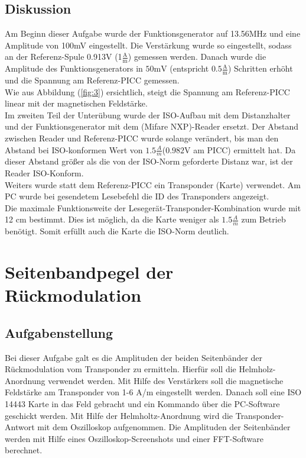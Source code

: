 \documentclass[12pt,a4paper,ngerman]{article}
\begin{document}
\subsection{Diskussion}
Am Beginn dieser Aufgabe wurde der Funktionsgenerator auf 13.56MHz und eine Amplitude von 100mV eingestellt. 
Die Verstärkung wurde so eingestellt, sodass an der Referenz-Spule 0.913V (1$\frac{\text{A}}{\text{m}}$) gemessen werden.
Danach wurde die Amplitude des Funktionsgenerators in $50 \text{mV}$ (entspricht $0.5 \frac{\text{A}}{\text{m}}$) Schritten erhöht und die Spannung am Referenz-PICC gemessen. \\
Wie aus Abbildung (\ref{fig:3}) ersichtlich, steigt die Spannung am Referenz-PICC linear mit der magnetischen Feldstärke. \\
Im zweiten Teil der Unterübung wurde der ISO-Aufbau mit dem Distanzhalter und der Funktionsgenerator mit dem (Mifare NXP)-Reader ersetzt. 
Der Abstand zwischen Reader und Referenz-PICC wurde solange verändert, bis man den Abstand bei ISO-konformen Wert von $1.5\frac{A}{m}$($0.982$V am PICC) ermittelt hat. Da dieser Abstand größer als die von der ISO-Norm geforderte Distanz war, ist der Reader ISO-Konform. \\ Weiters wurde statt dem Referenz-PICC ein Transponder (Karte) verwendet. Am PC wurde bei gesendetem Lesebefehl die ID des Transponders angezeigt.  \\ 
Die maximale Funktionsweite der Lesegerät-Transponder-Kombination wurde mit 12 cm bestimmt.
Dies ist möglich, da die Karte weniger als $1.5\frac{A}{m}$ zum Betrieb benötigt. Somit erfüllt auch die Karte die ISO-Norm deutlich. 


\pagebreak
\section{Seitenbandpegel der Rückmodulation}
\subsection{Aufgabenstellung}
Bei dieser Aufgabe galt es die Amplituden der beiden Seitenbänder der Rückmodulation vom Transponder zu ermitteln. Hierfür soll die Helmholz-Anordnung verwendet werden. Mit Hilfe des Verstärkers soll die magnetische Feldstärke am Transponder von 1-6 A/m eingestellt werden. Danach soll eine ISO 14443 Karte in das Feld gebracht und ein Kommando über die PC-Software geschickt werden. Mit Hilfe der Helmholtz-Anordnung wird die Transponder-Antwort mit dem Oszilloskop aufgenommen. Die Amplituden der Seitenbänder werden mit Hilfe eines Oszilloskop-Screenshots und einer FFT-Software berechnet. 
\end{document}

